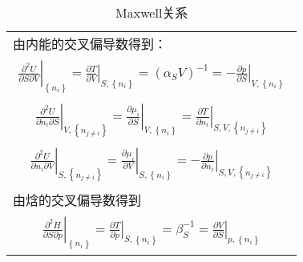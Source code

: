 \documentclass[main.tex]{subfiles}
\begin{document}
\begin{longtable}{m{}}
  \caption{Maxwell关系}\label{tab:Maxwell_relations}                                                                                                                                                                                                                                                 \\
  \hline
  由内能的交叉偏导数得到：                                                                                                                                                                                                                                                                                     \\[-4ex]
  \begin{align}
    \left.\frac{\partial^2 U}{\partial S\partial V}\right|_{\left\{n_i\right\}}              =\left.\frac{\partial T}{\partial V}\right|_{S,\left\{n_i\right\}}=\left(\alpha_S V\right)^{-1}=-\left.\frac{\partial p}{\partial S}\right|_{V,\left\{n_i\right\}}\label{eq:I.1_Maxwell_USV}\end{align} \\ [-8ex]
  \begin{align}\left.\frac{\partial ^2U}{\partial n_i\partial S}\right|_{V,\left\{n_{j\neq i}\right\}}  =\left.\frac{\partial \mu_i}{\partial S}\right|_{V,\left\{n_i\right\}}=\left.\frac{\partial T}{\partial n_i}\right|_{S,V,\left\{n_{j\neq i}\right\}}\label{eq:I.1_Maxwell_UnS}\end{align}  \\[-8ex]
  \begin{align}\left.\frac{\partial ^2U}{\partial n_i\partial V}\right|_{S,\left\{n_{j\neq i}\right\}}  =\left.\frac{\partial \mu_i}{\partial V}\right|_{S,\left\{n_i\right\}}=-\left.\frac{\partial p}{\partial n_i}\right|_{S,V,\left\{n_{j\neq i}\right\}}\label{eq:I.1_Maxwell_UnV}\end{align} \\
  由焓的交叉偏导数得到                                                                                                                                                                                                                                                                                       \\ [-4ex]
  \begin{align}
    \left.\frac{\partial^2 H}{\partial S\partial p}\right|_{\left\{n_i\right\}}              =\left.\frac{\partial T}{\partial p}\right|_{S,\left\{n_i\right\}}=\beta_S^{-1}=\left.\frac{\partial V}{\partial S}\right|_{p,\left\{n_i\right\}}\label{eq:I.1_Maxwell_HSp}\end{align}                  \\[-8ex]

\end{longtable}
\end{document}
